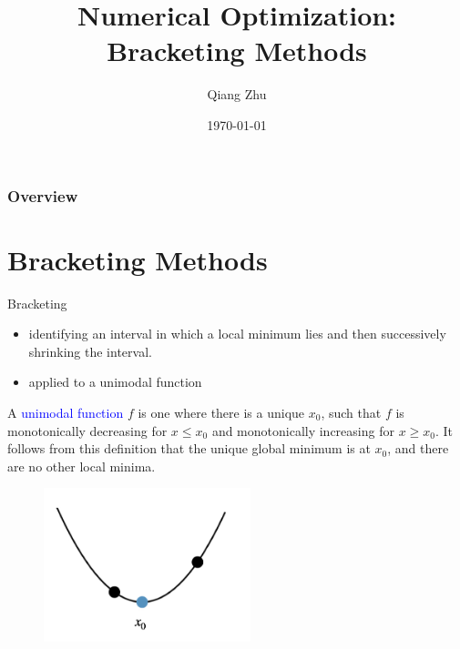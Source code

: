 \documentclass{beamer}
\title[Optimization]{Numerical Optimization: Bracketing Methods} %
\author{Qiang Zhu} %
\institute[University of Nevada Las Vegas] %
{
University of Nevada Las Vegas\\ %
\medskip
}
\date{\today} %
\begin{document}
\begin{frame}
\titlepage %
\end{frame}

\begin{frame}
\frametitle{Overview} %
\tableofcontents %
\end{frame}



\section{Bracketing Methods}
\begin{frame}{Bracketing}
\begin{itemize}
    \item identifying an interval in which a local minimum lies and then successively shrinking the interval.
    \item applied to a unimodal function
\end{itemize}
A \textcolor{blue}{unimodal function} $f$ is one where there is a unique $x_0$, such that $f$ is monotonically decreasing for $x \leq x_0$ and monotonically increasing for $x \geq x_0$. It follows from this definition that the unique global minimum is at $x_0$, and there are no other local minima.
\begin{figure}
\centering
\includegraphics[width=60mm]{Figs/unimodal.jpeg}
\end{figure}
\end{frame}
\end{document}
